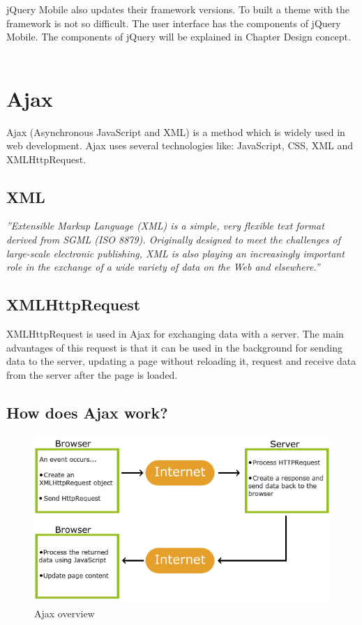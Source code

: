   jQuery Mobile  also updates their framework versions. To built a theme with the framework is not so difficult. The user interface has the components of jQuery Mobile. The components of jQuery will be explained in Chapter Design concept.\\\\
  
  \section {Ajax}
  Ajax (Asynchronous JavaScript and XML) is a method which is widely used in web development. Ajax uses several technologies like: JavaScript, CSS, XML and XMLHttpRequest.\cite{ajax}
  \\
  \subsection{XML}
  \textit{''Extensible Markup Language (XML) is a simple, very flexible text format derived from SGML (ISO 8879). Originally designed to meet the challenges of large-scale electronic publishing, XML is also playing an increasingly important role in the exchange of a wide variety of data on the Web and elsewhere.''}\cite{xml}
  \\
  \subsection{XMLHttpRequest}
  XMLHttpRequest is used in Ajax for exchanging data with a server. The main advantages of this request is that it can be used in the background for sending data to the server, updating a page without reloading it, request and receive data from the server after the page is loaded.\cite{xmlHttp} 
  \newpage
  \subsection{How does Ajax work?}
  \begin{figure}[htbp]
  \centering
  \includegraphics[width=\textwidth,height=\textheight,keepaspectratio]{graphics/ajaxwork.png}
  \caption{Ajax overview\cite{ajax}}
  \end{figure}
  
